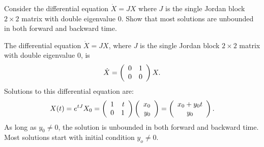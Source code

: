 \documentclass{ximera}
\begin{document}
\begin{exercise} \label{c11.1.3A}
Consider the differential equation $\dot{X}=JX$ where $J$ is the single Jordan 
block $2\times 2$ matrix with double eigenvalue $0$.  Show that most 
solutions are unbounded in both forward and backward time.

\begin{solution}
The differential equation $\dot{X}=JX$, where $J$ is the 
single Jordan block $2\times 2$ matrix with double eigenvalue $0$, is
\[
\dot{X} = \left(\begin{array}{rr} 0 & 1\\ 0 &0\end{array}\right)X.
\]
Solutions to this differential equation are:
\[
X(t) = e^{tJ}X_0 = \left(\begin{array}{rr} 1 & t\\ 0 &1\end{array}\right)\left(\begin{array}{r} x_0 \\ y_0\end{array}\right) =
\left(\begin{array}{c} x_0+y_0t \\ y_0\end{array}\right).
\]
As long as $y_0\neq 0$, the solution is unbounded in both forward and 
backward time.  Most solutions start with initial condition $y_o\neq 0$.

\end{solution}
\end{exercise}
\end{document}
